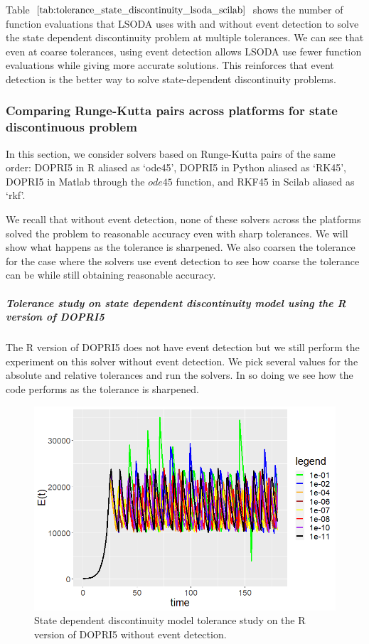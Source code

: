Table $\ref{tab:tolerance_state_discontinuity_lsoda_scilab}$ shows the number of function evaluations that LSODA uses with and without event detection to solve the state dependent discontinuity problem at multiple tolerances. We can see that even at coarse tolerances, using event detection allows LSODA use fewer function evaluations while giving more accurate solutions. This reinforces that event detection is the better way to solve state-dependent discontinuity problems. 

\subsubsection{Comparing Runge-Kutta pairs across platforms for state discontinuous problem}
In this section, we consider solvers based on Runge-Kutta pairs of the same order: DOPRI5 in R aliased as `ode45', DOPRI5 in Python aliased as `RK45', DOPRI5 in Matlab through the $ode45$ function, and RKF45 in Scilab aliased as `rkf'.

We recall that without event detection, none of these solvers across the platforms solved the problem to reasonable accuracy even with sharp tolerances. We will show what happens as the tolerance is sharpened. We also coarsen the tolerance for the case where the solvers use event detection to see how coarse the tolerance can be while still obtaining reasonable accuracy.

\subparagraph{Tolerance study on state dependent discontinuity model using the R version of DOPRI5}
The R version of DOPRI5 does not have event detection but we still perform the experiment on this solver without event detection. We pick several values for the absolute and relative tolerances and run the solvers. In so doing we see how the code performs as the tolerance is sharpened. 

\begin{figure}[h]
\centering
\includegraphics[width=0.7\linewidth]{./figures/tolerance_state_rk45_no_event_R}
\caption{State dependent discontinuity model tolerance study on the R version of DOPRI5 without event detection.}
\label{fig:tolerance_state_rk45_no_event_R}
\end{figure}

